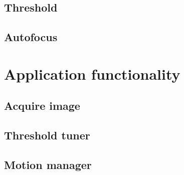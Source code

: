 \subsection{Threshold}



\subsection{Autofocus}




\section{Application functionality}

\subsection{Acquire image}

\subsection{Threshold tuner}

\subsection{Motion manager}



